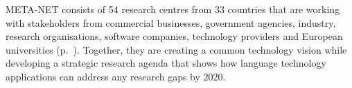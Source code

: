 \begin{Parallel}[c]{78mm}{78mm}
{    META-NET consists of 54 research centres from 33 countries that are working with stakeholders from commercial businesses, government agencies, industry, research organisations, software companies, technology providers and European universities (p.~\pageref{metanetmembers}). Together, they are creating a common technology vision while developing a strategic research agenda that shows how language technology applications can address any research gaps by 2020.
  } 
  \ParallelPar
\end{Parallel}

\makefundingnotice


\cleardoublepage


\tableofcontents



\cleardoublepage

\setcounter{page}{1}
\pagestyle{scrheadings}



